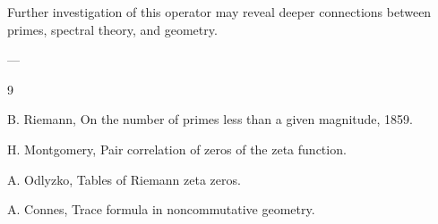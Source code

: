 \documentclass[11pt,a4paper]{article}
\begin{document}
	Further investigation of this operator may reveal
	deeper connections between primes, spectral theory,
	and geometry.
	
	---
	
	\begin{thebibliography}{9}
		
		B. Riemann,
		On the number of primes less than a given magnitude,
		1859.
		
		H. Montgomery,
		Pair correlation of zeros of the zeta function.
		
		A. Odlyzko,
		Tables of Riemann zeta zeros.
		
		A. Connes,
		Trace formula in noncommutative geometry.
		
	\end{thebibliography}
	
\end{document}
